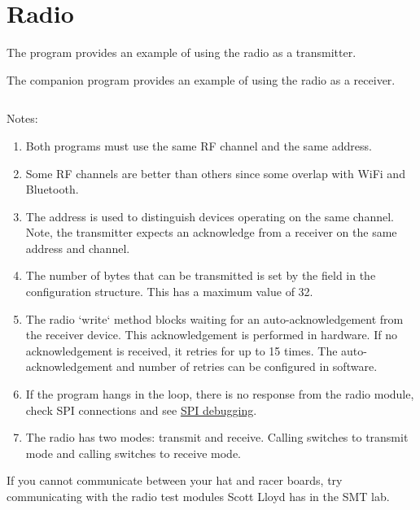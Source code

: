 \section{Radio}
\label{radio-test}

The program  provides
an example of using the radio as a transmitter.

The companion program
 provides an example
of using the radio as a receiver.

\inputminted{C}{../../src/test-apps/radio_rx_test1/radio_rx_test1.c}


Notes:
%
\begin{enumerate}
\item Both programs must use the same RF channel and the same address.

\item Some RF channels are better than others since some overlap with
  WiFi and Bluetooth.

\item The address is used to distinguish devices operating on the same
  channel. Note, the transmitter expects an acknowledge from a
  receiver on the same address and channel.

\item The number of bytes that can be transmitted is set by the
   field in the configuration structure.  This has a
  maximum value of 32.

\item The radio `write` method blocks waiting for an
  auto-acknowledgement from the receiver device. This acknowledgement
  is performed in hardware. If no acknowledgement is received, it
  retries for up to 15 times. The auto-acknowledgement and number of
  retries can be configured in software.

\item If the program hangs in the  loop, there is no
  response from the radio module, check SPI connections and see
  \hyperref[debugging-spi]{SPI debugging}.

\item The radio has two modes: transmit and receive.  Calling
   switches to transmit mode and calling
   switches to receive mode.

\end{enumerate}

If you cannot communicate between your hat and racer boards, try
communicating with the radio test modules Scott Lloyd has in the SMT
lab.


